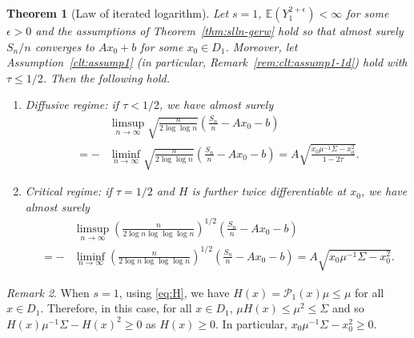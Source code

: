 \documentclass[12pt]{amsart}
\theoremstyle{plain}
\newtheorem{theorem}{Theorem}[section]
\theoremstyle{remark}
\newtheorem{remark}[theorem]{Remark}
\numberwithin{equation}{section}
\begin{document}
\begin{theorem}[Law of iterated logarithm]\label{thm:lil-gerw-cric}
    Let $s = 1$, $\mathbb{E}\left({Y}_1^{2+\epsilon}\right) < \infty$ for some $\epsilon > 0$ and the assumptions of Theorem~\ref{thm:slln-gerw} hold so that almost surely ${{S}_n}/{n}$ converges to ${A}{x}_0 + {b}$ for some ${x}_0 \in {D}_1$. Moreover, let Assumption~\ref{clt:assump1} (in particular, Remark~\ref{rem:clt:assump1-1d}) hold with $\tau \leq 1/2$. Then the following hold.
\begin{enumerate}
\item[a)] Diffusive regime: if $\tau < 1/2$, we have almost surely
\begin{align}\label{eq:lil-gerw1}
    &\limsup_{n \to \infty}\sqrt{\frac{n}{2\log\log n}} \left(\frac{{S}_n}{n} - {A}{x}_0 - {b}\right) \nonumber
    \\ = - &\liminf_{n \to \infty}\sqrt{\frac{n}{2\log\log n}} \left(\frac{{S}_n}{n} - {A}{x}_0 - {b}\right) = A\sqrt{\frac{x_0\mu^{-1}{\Sigma}-x^2_0}{1-2\tau}}. 
\end{align}
\item[b)] Critical regime: if $\tau = 1/2$ and ${H}$ is further twice differentiable at ${x}_0$, we have almost surely
\begin{align}\label{eq:lil-gerw2}
    &\limsup_{n \to \infty}\left(\frac{n}{2\log n\log\log\log n}\right)^{1/2} \left(\frac{{S}_n}{n} - {A}{x}_0 - {b}\right) \nonumber \\ = - &\liminf_{n \to \infty}\left(\frac{n}{2\log n\log\log\log n}\right)^{1/2} \left(\frac{{S}_n}{n} - {A}{x}_0 - {b}\right) = A\sqrt{{x_0\mu^{-1}{\Sigma}-x^2_0}}. 
\end{align}
\end{enumerate}
\end{theorem}

\begin{remark}\label{rem:new2}
    When $s = 1$, using \eqref{eq:H}, we have $H(x) = \mathcal{P}_1(x)\mu \leq \mu$ for all $x \in D_1$. Therefore, in this case, for all $x \in D_1$, $\mu H(x) \leq \mu^2 \leq \Sigma$ and so ${H(x)\mu^{-1}{\Sigma}-H(x)^2} \geq 0$ as $H(x) \geq 0$. In particular, ${x_0\mu^{-1}{\Sigma}-x^2_0} \geq 0$.
\end{remark}
\end{document}
